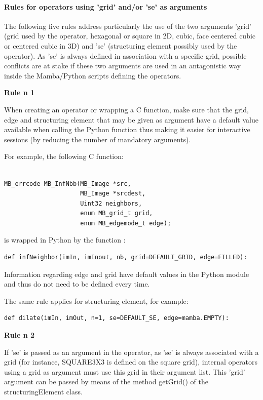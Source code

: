 \documentclass[a4paper,10pt,oneside]{article}
\begin{document}
\paragraph{Rules for operators using 'grid' and/or 'se' as arguments}

The following five rules address particularly the use of the two arguments 'grid'
(grid used by the operator, hexagonal or square in 2D, cubic, face centered cubic or
centered cubic in 3D) and 'se' (structuring element
possibly used by the operator). As 'se' is always defined in association with a
specific grid, possible conflicts are at stake if these two arguments are used
in an antagonistic way inside the Mamba/Python scripts defining the operators.\par

\textbf{Rule n\textdegree{} 1}

When creating an operator or wrapping a C function, make sure that the grid, edge
and structuring element that may be given as argument have a default value
available when calling the Python function thus making it easier for
interactive sessions (by reducing the number of mandatory arguments).

For example, the following C function:
\lstset{language=C} 
\begin{lstlisting} 

MB_errcode MB_InfNbb(MB_Image *src,
                     MB_Image *srcdest,
                     Uint32 neighbors,
                     enum MB_grid_t grid,
                     enum MB_edgemode_t edge);
\end{lstlisting}
is wrapped in Python by the function :
\lstset{language=Python}
\begin{lstlisting} 
def infNeighbor(imIn, imInout, nb, grid=DEFAULT_GRID, edge=FILLED):
\end{lstlisting}

Information regarding edge and grid have default values in the Python module 
and thus do not need to be defined every time.

The same rule applies for structuring element, for example:
\begin{lstlisting} 
def dilate(imIn, imOut, n=1, se=DEFAULT_SE, edge=mamba.EMPTY):
\end{lstlisting}

\textbf{Rule n\textdegree{} 2}

If 'se' is passed as an argument in the operator, as 'se' is always associated
with a grid (for instance, SQUARE3X3 is defined on the square grid), internal
operators using a grid as argument must use this grid in their argument list. 
This 'grid' argument can be passed by means of the method getGrid() of the 
structuringElement class.\par
\end{document}
